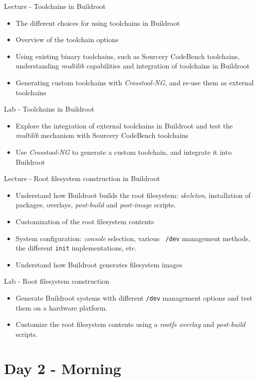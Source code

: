 \documentclass[a4paper,12pt,obeyspaces,spaces,hyphens]{article}
\begin{document}
\feagendatwocolumn
{Lecture - Toolchains in Buildroot}
{
  \begin{itemize}
  \item The different choices for using toolchains in Buildroot
  \item Overview of the toolchain options
  \item Using existing binary toolchains, such as Sourcery CodeBench
    toolchains, understanding {\em multilib} capabilities and
    integration of toolchains in Buildroot
  \item Generating custom toolchains with {\em Crosstool-NG}, and
    re-use them as external toolchains
  \end{itemize}
}
{Lab - Toolchains in Buildroot}
{
  \begin{itemize}
  \item Explore the integration of external toolchains in Buildroot
    and test the {\em multilib} mechanism with Sourcery CodeBench
    toolchains
  \item Use {\em Crosstool-NG} to generate a custom toolchain, and
    integrate it into Buildroot
  \end{itemize}
}

\feagendatwocolumn
{Lecture - Root filesystem construction in Buildroot}
{
  \begin{itemize}
  \item Understand how Buildroot builds the root filesystem: {\em
      skeleton}, installation of packages, overlays, {\em post-build}
    and {\em post-image} scripts.
  \item Customization of the root filesystem contents
  \item System configuration: {\em console} selection, various {\tt
      /dev} management methods, the different {\tt init}
    implementations, etc.
  \item Understand how Buildroot generates filesystem images
  \end{itemize}
}
{Lab - Root filesystem construction}
{
  \begin{itemize}
  \item Generate Buildroot systems with different {\tt /dev}
    management options and test them on a hardware platform.
  \item Customize the root filesystem contents using a {\em rootfs
      overlay} and {\em post-build} scripts.
  \end{itemize}
}

\section{Day 2 - Morning}
\end{document}
